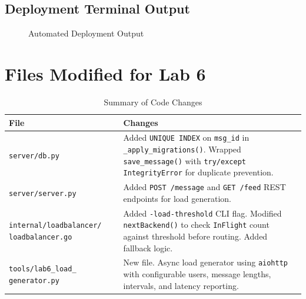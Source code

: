 \documentclass[12pt, a4paper]{article}
\begin{document}
\subsection{Deployment Terminal Output}

\begin{figure}[H]
\centering
{}
\caption{Automated Deployment Output}
\label{fig:deployment}
\end{figure}


\section{Files Modified for Lab 6}

\begin{table}[H]
\centering
\caption{Summary of Code Changes}
\label{tab:files}
\begin{tabularx}{\textwidth}{lX}
\toprule
\textbf{File} & \textbf{Changes} \\
\midrule
\texttt{server/db.py} & Added \texttt{UNIQUE INDEX} on \texttt{msg\_id} in \texttt{\_apply\_migrations()}. Wrapped \texttt{save\_message()} with \texttt{try/except IntegrityError} for duplicate prevention. \\
\addlinespace
\texttt{server/server.py} & Added \texttt{POST /message} and \texttt{GET /feed} REST endpoints for load generation. \\
\addlinespace
\texttt{internal/loadbalancer/} \newline \texttt{loadbalancer.go} & Added \texttt{-load-threshold} CLI flag. Modified \texttt{nextBackend()} to check \texttt{InFlight} count against threshold before routing. Added fallback logic. \\
\addlinespace
\texttt{tools/lab6\_load\_} \newline \texttt{generator.py} & New file. Async load generator using \texttt{aiohttp} with configurable users, message lengths, intervals, and latency reporting. \\
\bottomrule
\end{tabularx}
\end{table}
\end{document}
